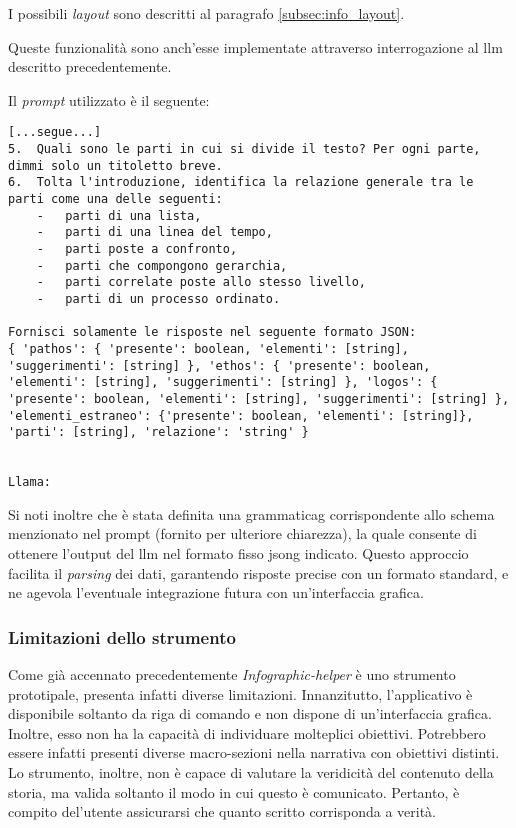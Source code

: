 I possibili \emph{layout} sono descritti al paragrafo \ref{subsec:info_layout}.

\bigskip
\noindent Queste funzionalità sono anch'esse implementate attraverso interrogazione al \gls{llm} descritto precedentemente. 

Il \emph{prompt} utilizzato è il seguente:
\begin{lstlisting}[style=htmlcssjs]
[...segue...]
5.	Quali sono le parti in cui si divide il testo? Per ogni parte, dimmi solo un titoletto breve.
6.	Tolta l'introduzione, identifica la relazione generale tra le parti come una delle seguenti:
    -	parti di una lista, 
    -	parti di una linea del tempo, 
    -	parti poste a confronto, 
    -	parti che compongono gerarchia, 
    -	parti correlate poste allo stesso livello, 
    -	parti di un processo ordinato. 

Fornisci solamente le risposte nel seguente formato JSON: 
{ 'pathos': { 'presente': boolean, 'elementi': [string], 'suggerimenti': [string] }, 'ethos': { 'presente': boolean, 'elementi': [string], 'suggerimenti': [string] }, 'logos': { 'presente': boolean, 'elementi': [string], 'suggerimenti': [string] }, 'elementi_estraneo': {'presente': boolean, 'elementi': [string]}, 'parti': [string], 'relazione': 'string' }


Llama:
\end{lstlisting}

\noindent Si noti inoltre che è stata definita una \gls{grammaticag} corrispondente allo schema menzionato nel prompt (fornito per ulteriore chiarezza), la quale consente di ottenere l'output del \gls{llm} nel formato fisso \gls{jsong} indicato. 
Questo approccio facilita il \emph{parsing} dei dati, garantendo risposte precise con un formato standard, e ne agevola l'eventuale integrazione futura con un'interfaccia grafica.


\subsubsection{Limitazioni dello strumento}
Come già accennato precedentemente \emph{Infographic-helper} è uno strumento prototipale, presenta infatti diverse limitazioni.
Innanzitutto, l'applicativo è disponibile soltanto da riga di comando e non dispone di un'interfaccia grafica.
Inoltre, esso non ha la capacità di individuare molteplici obiettivi. Potrebbero essere infatti presenti diverse macro-sezioni nella narrativa
con obiettivi distinti. 
Lo strumento, inoltre, non è capace di valutare la veridicità del contenuto della storia, ma valida soltanto il modo in cui questo è comunicato. Pertanto, è compito del'utente
assicurarsi che quanto scritto corrisponda a verità.

